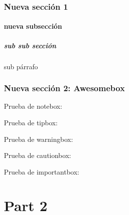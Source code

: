 \documentclass{yukibook}
\begin{document}
\section{Nueva sección 1}
\Blindtext[1]

\subsection{nueva subsección}
\Blindtext[1]

\subsubsection{sub sub sección}
\Blindtext[1]

\subparagraph{sub párrafo}
\Blindtext[1]

\section{Nueva sección 2: Awesomebox}
Prueba de notebox:

\notebox{\Blindtext[1]}

Prueba de tipbox:
\tipbox{\Blindtext[1]}

Prueba de warningbox:
\warningbox{\Blindtext[1]}

Prueba de cautionbox:
\cautionbox{\Blindtext[1]}

Prueba de importantbox:
\importantbox{\Blindtext[1]}


\begin{info-box}
  \notebox{\Blindtext[1]}
\end{info-box}
\begin{warning-box}
  \Blindtext[1]
\end{warning-box}
\begin{error-box}
  \Blindtext[1]
\end{error-box}


\part{Part 2}
\Blinddocument
\end{document}
